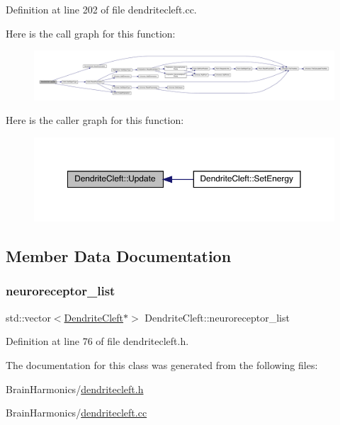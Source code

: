 Definition at line 202 of file dendritecleft.\+cc.

Here is the call graph for this function\+:
\nopagebreak
\begin{figure}[H]
\begin{center}
\leavevmode
\includegraphics[width=350pt]{class_dendrite_cleft_a3a75af4d6fd97c9635134509f170a04e_cgraph}
\end{center}
\end{figure}
Here is the caller graph for this function\+:
\nopagebreak
\begin{figure}[H]
\begin{center}
\leavevmode
\includegraphics[width=350pt]{class_dendrite_cleft_a3a75af4d6fd97c9635134509f170a04e_icgraph}
\end{center}
\end{figure}


\subsection{Member Data Documentation}
\mbox{\label{class_dendrite_cleft_a42de9c556ce58c9f511031361755a0c3}} 
\subsubsection{\texorpdfstring{neuroreceptor\+\_\+list}{neuroreceptor\_list}}
{\footnotesize\ttfamily std\+::vector$<$\hyperlink{class_dendrite_cleft}{Dendrite\+Cleft}$\ast$$>$ Dendrite\+Cleft\+::neuroreceptor\+\_\+list\hspace{0.3cm}{\ttfamily [protected]}}



Definition at line 76 of file dendritecleft.\+h.



The documentation for this class was generated from the following files\+:\begin{DoxyCompactItemize}
\item 
Brain\+Harmonics/\hyperlink{dendritecleft_8h}{dendritecleft.\+h}\item 
Brain\+Harmonics/\hyperlink{dendritecleft_8cc}{dendritecleft.\+cc}\end{DoxyCompactItemize}

